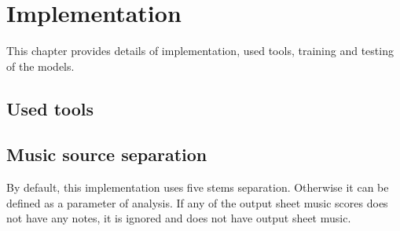 \chapter{Implementation}\label{ch:implementation}

This chapter provides details of implementation, used tools, training and testing of the models.

\section{Used tools}\label{sec:used-tools}


\section{Music source separation}\label{sec:realisation:music-source-separation}
By default, this implementation uses five stems separation. Otherwise it can be defined as a parameter of analysis.
If any of the output sheet music scores does not have any notes, it is ignored and does not have output sheet music.

